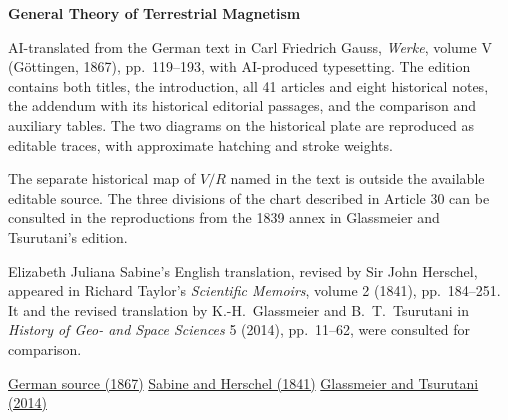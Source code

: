 \clearpage
\thispagestyle{empty}
\begin{center}\Large\textbf{General Theory of Terrestrial Magnetism}\end{center}

AI-translated from the German text in Carl Friedrich Gauss, \textit{Werke}, volume V (Göttingen, 1867), pp.~119--193, with AI-produced typesetting. The edition contains both titles, the introduction, all 41 articles and eight historical notes, the addendum with its historical editorial passages, and the comparison and auxiliary tables. The two diagrams on the historical plate are reproduced as editable traces, with approximate hatching and stroke weights.

The separate historical map of \(V/R\) named in the text is outside the available editable source. The three divisions of the chart described in Article 30 can be consulted in the reproductions from the 1839 annex in Glassmeier and Tsurutani’s edition.

Elizabeth Juliana Sabine’s English translation, revised by Sir John Herschel, appeared in Richard Taylor’s \textit{Scientific Memoirs}, volume 2 (1841), pp.~184--251. It and the revised translation by K.-H.~Glassmeier and B.~T.~Tsurutani in \textit{History of Geo- and Space Sciences} 5 (2014), pp.~11--62, were consulted for comparison.

\noindent\href{https://gdz.sub.uni-goettingen.de/id/PPN236006339}{German source (1867)}\quad
\href{https://en.wikisource.org/wiki/Scientific_Memoirs/2/General_Theory_of_Terrestrial_Magnetism?oldid=4352379}{Sabine and Herschel (1841)}\quad
\href{https://doi.org/10.5194/hgss-5-11-2014}{Glassmeier and Tsurutani (2014)}
\clearpage
